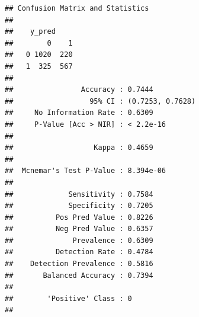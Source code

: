 \documentclass[
]{article}
\begin{document}
\begin{verbatim}
## Confusion Matrix and Statistics
## 
##    y_pred
##        0    1
##   0 1020  220
##   1  325  567
##                                           
##                Accuracy : 0.7444          
##                  95% CI : (0.7253, 0.7628)
##     No Information Rate : 0.6309          
##     P-Value [Acc > NIR] : < 2.2e-16       
##                                           
##                   Kappa : 0.4659          
##                                           
##  Mcnemar's Test P-Value : 8.394e-06       
##                                           
##             Sensitivity : 0.7584          
##             Specificity : 0.7205          
##          Pos Pred Value : 0.8226          
##          Neg Pred Value : 0.6357          
##              Prevalence : 0.6309          
##          Detection Rate : 0.4784          
##    Detection Prevalence : 0.5816          
##       Balanced Accuracy : 0.7394          
##                                           
##        'Positive' Class : 0               
## 
\end{verbatim}
\end{document}
